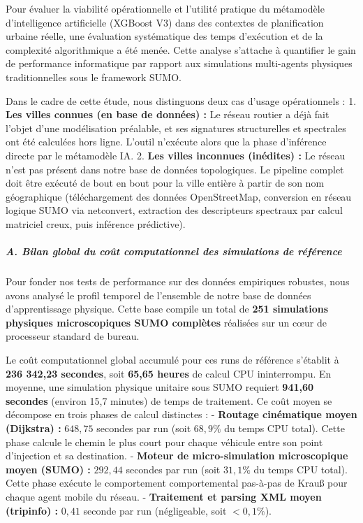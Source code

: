 \documentclass[10pt, a4paper]{article}
\begin{document}
Pour évaluer la viabilité opérationnelle et l'utilité pratique du
métamodèle d'intelligence artificielle (XGBoost V3) dans des contextes
de planification urbaine réelle, une évaluation systématique des temps
d'exécution et de la complexité algorithmique a été menée. Cette analyse
s'attache à quantifier le gain de performance informatique par rapport
aux simulations multi-agents physiques traditionnelles sous le framework
SUMO.

Dans le cadre de cette étude, nous distinguons deux cas d'usage
opérationnels : 1. \textbf{Les villes connues (en base de données) :} Le
réseau routier a déjà fait l'objet d'une modélisation préalable, et ses
signatures structurelles et spectrales ont été calculées hors ligne.
L'outil n'exécute alors que la phase d'inférence directe par le
métamodèle IA. 2. \textbf{Les villes inconnues (inédites) :} Le réseau
n'est pas présent dans notre base de données topologiques. Le pipeline
complet doit être exécuté de bout en bout pour la ville entière à partir
de son nom géographique (téléchargement des données OpenStreetMap,
conversion en réseau logique SUMO via netconvert, extraction des
descripteurs spectraux par calcul matriciel creux, puis inférence
prédictive).

\subparagraph{A. Bilan global du coût computationnel des simulations de
référence}\label{a.-bilan-global-du-couxfbt-computationnel-des-simulations-de-ruxe9fuxe9rence}

Pour fonder nos tests de performance sur des données empiriques
robustes, nous avons analysé le profil temporel de l'ensemble de notre
base de données d'apprentissage physique. Cette base compile un total de
\textbf{251 simulations physiques microscopiques SUMO complètes}
réalisées sur un cœur de processeur standard de bureau.

Le coût computationnel global accumulé pour ces runs de référence
s'établit à \textbf{236 342,23 secondes}, soit \textbf{65,65 heures} de
calcul CPU ininterrompu. En moyenne, une simulation physique unitaire
sous SUMO requiert \textbf{941,60 secondes} (environ 15,7 minutes) de
temps de traitement. Ce coût moyen se décompose en trois phases de
calcul distinctes : - \textbf{Routage cinématique moyen (Dijkstra) :}
\(648,75\) secondes par run (soit \(68,9\%\) du temps CPU total). Cette
phase calcule le chemin le plus court pour chaque véhicule entre son
point d'injection et sa destination. - \textbf{Moteur de
micro-simulation microscopique moyen (SUMO) :} \(292,44\) secondes par
run (soit \(31,1\%\) du temps CPU total). Cette phase exécute le
comportement comportemental pas-à-pas de Krauß pour chaque agent mobile
du réseau. - \textbf{Traitement et parsing XML moyen (tripinfo) :}
\(0,41\) seconde par run (négligeable, soit \(<0,1\%\)).
\end{document}
